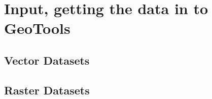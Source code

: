 \chapter{Input, getting the data in to GeoTools}\label{input}
\section{Vector Datasets}\label{vector}
\section{Raster Datasets}\label{raster}